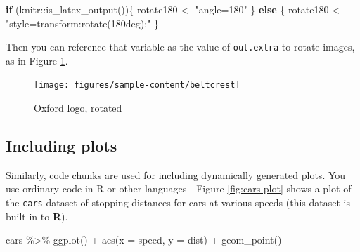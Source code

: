 \documentclass[a4paper, nobind]{templates/ociamthesis}
\newenvironment{Shaded}{\begin{snugshade}}{\end{snugshade}}
\newcommand{\AttributeTok}[1]{\textcolor[rgb]{0.77,0.63,0.00}{#1}}
\newcommand{\ControlFlowTok}[1]{\textcolor[rgb]{0.13,0.29,0.53}{\textbf{#1}}}
\newcommand{\FunctionTok}[1]{\textcolor[rgb]{0.00,0.00,0.00}{#1}}
\newcommand{\NormalTok}[1]{#1}
\newcommand{\OtherTok}[1]{\textcolor[rgb]{0.56,0.35,0.01}{#1}}
\newcommand{\SpecialCharTok}[1]{\textcolor[rgb]{0.00,0.00,0.00}{#1}}
\newcommand{\StringTok}[1]{\textcolor[rgb]{0.31,0.60,0.02}{#1}}
\renewenvironment{Shaded}
{
  \vspace{10pt}%
  \begin{snugshade}%
}{%
  \end{snugshade}%
  \vspace{8pt}%
}
\begin{document}
\begin{Shaded}
\begin{Highlighting}[]
\ControlFlowTok{if}\NormalTok{ (knitr}\SpecialCharTok{::}\FunctionTok{is\_latex\_output}\NormalTok{())\{}
\NormalTok{  rotate180 }\OtherTok{\textless{}{-}} \StringTok{"angle=180"}
\NormalTok{\} }\ControlFlowTok{else}\NormalTok{ \{}
\NormalTok{  rotate180 }\OtherTok{\textless{}{-}} \StringTok{"style=\textquotesingle{}transform:rotate(180deg);\textquotesingle{}"}
\NormalTok{\}}
\end{Highlighting}
\end{Shaded}

Then you can reference that variable as the value of \texttt{out.extra} to rotate images, as in Figure \ref{fig:oxford-logo-rotated}.

\begin{figure}

{\centering \texttt{[image: figures/sample-content/beltcrest]} 

}

\caption{Oxford logo, rotated}\label{fig:oxford-logo-rotated}
\end{figure}

\hypertarget{including-plots}{%
\subsection{Including plots}\label{including-plots}}

Similarly, code chunks are used for including dynamically generated plots.
You use ordinary code in R or other languages - Figure \ref{fig:cars-plot} shows a plot of the \texttt{cars} dataset of stopping distances for cars at various speeds (this dataset is built in to \textbf{R}).

\begin{Shaded}
\begin{Highlighting}[]
\NormalTok{cars }\SpecialCharTok{\%\textgreater{}\%} 
  \FunctionTok{ggplot}\NormalTok{() }\SpecialCharTok{+}
    \FunctionTok{aes}\NormalTok{(}\AttributeTok{x =}\NormalTok{ speed, }\AttributeTok{y =}\NormalTok{ dist) }\SpecialCharTok{+}
    \FunctionTok{geom\_point}\NormalTok{()}
\end{Highlighting}
\end{Shaded}
\end{document}
